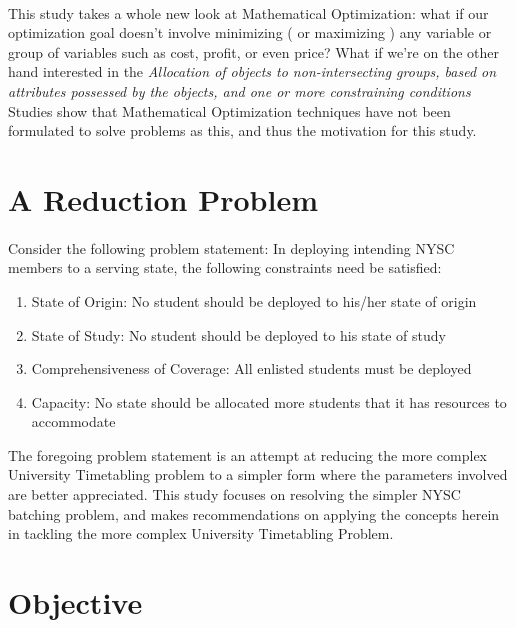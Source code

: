\documentclass[a4paper,openany]{book}
\begin{document}
            \paragraph{}
            	This study takes a whole new look at Mathematical Optimization: what if our optimization goal doesn't involve minimizing ( or maximizing ) any variable or group of variables such as cost, profit, or even price? What if we're on the other hand interested in the \textit{Allocation of objects to non-intersecting groups, based on attributes possessed by the objects, and one or more constraining conditions} \\
                Studies show that Mathematical Optimization techniques have not been formulated to solve problems as this, and thus the motivation for this study.
        \section{A Reduction Problem}
            \paragraph{}
            Consider the following problem statement: In deploying intending NYSC members to a serving state, the following constraints need be satisfied:
            \begin{enumerate}
                \item State of Origin: No student should be deployed to his/her state of origin
                \item State of Study: No student should be deployed to his state of study
                \item Comprehensiveness of Coverage: All enlisted students must be deployed
                \item Capacity: No state should be allocated more students that it has resources to accommodate
            \end{enumerate}
            The foregoing problem statement is an attempt at reducing the more complex University Timetabling problem to a simpler form where the parameters involved are better appreciated. This study focuses on resolving the simpler NYSC batching problem, and makes recommendations on applying the concepts herein in tackling the more complex University Timetabling Problem.
		\section{Objective}
\end{document}
